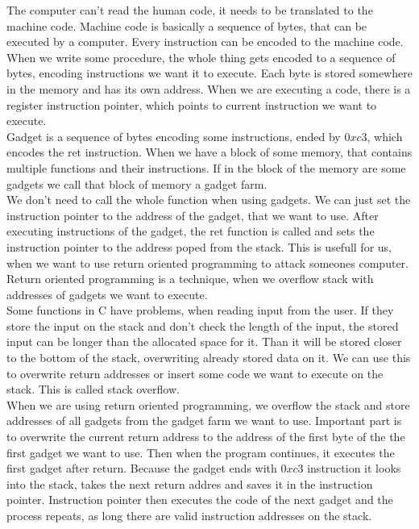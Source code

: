 \documentclass[a4paper]{article}
\begin{document}
The computer can't read the human code, it needs to be translated to the machine code. Machine
code is basically a sequence of bytes, that can be executed by a computer. Every instruction
can be encoded to the machine code. When we write some procedure, the whole thing gets encoded
to a sequence of bytes, encoding instructions we want it to execute. 
Each byte is stored somewhere in the memory and has its own address. When we are executing a code,
there is a register instruction pointer, which points to current instruction
we want to execute. \\
Gadget is a sequence of bytes encoding some instructions, ended by $0xc3$, which encodes the ret
instruction. When we have a block of some memory, that contains multiple functions and their  
instructions. If in the block of the memory are some gadgets we call that block of memory a 
gadget farm.
\\
We don't need to call the whole function when using gadgets. We can just set the instruction
pointer to the address of the gadget, that we want to use. After executing instructions 
of the gadget, the ret function is called and sets the instruction pointer
to the address poped from the stack. This is usefull for us, when we want to use return oriented
programming to attack someones computer.  \\
Return oriented programming is a technique, when we overflow stack with addresses of gadgets 
we want to execute. \\
Some functions in C have problems, when reading input from the user.
If they store the input on the stack and don't check the length of the input, the stored input can 
be longer
than the allocated space for it. Than it will be stored closer to the bottom of the stack, overwriting
already stored data on it. We can use this to overwrite return addresses or insert some code 
we want to execute on the stack. This is called stack overflow.
\\
When we are using return oriented programming, we overflow the stack and store addresses 
of all gadgets
from the gadget farm we want to use. Important part is to overwrite the current return address to 
the address of the first byte of the the first gadget we want to use. 
Then when the program continues, it 
executes the first gadget after return. Because the gadget ends with $0xc3$ instruction it looks
into the stack, takes the next return addres and saves it in the instruction pointer. 
Instruction pointer then executes the code of the next gadget and the process repeats, as long
there are valid instruction addresses on the stack.
\end{document}
